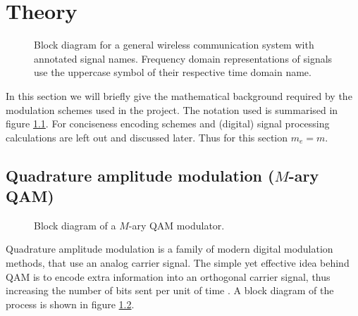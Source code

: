 
\chapter{Theory}

\begin{figure}
	\centering
	\resizebox{\linewidth}{!}{
		
	}
	\caption{
		Block diagram for a general wireless communication system with annotated signal names. Frequency domain representations of signals use the uppercase symbol of their respective time domain name.
		\label{fig:notation}
	}
\end{figure}

In this section we will briefly give the mathematical background required by the modulation schemes used in the project. The notation used is summarised in figure \ref{fig:notation}. For conciseness encoding schemes and (digital) signal processing calculations are left out and discussed later. Thus for this section \(m_e = m\).



\section{Quadrature amplitude modulation (\(M\)-ary QAM)}

\begin{figure}
	\centering
	\resizebox{\linewidth}{!}{
		
	}
	\caption{
		Block diagram of a \(M\)-ary QAM modulator.
		\label{fig:quadrature-modulation}
	}
\end{figure}

Quadrature amplitude modulation is a family of modern digital modulation methods, that use an analog carrier signal. The simple yet effective idea behind QAM is to encode extra information into an orthogonal carrier signal, thus increasing the number of bits sent per unit of time \cite{Gallager,Kneubuehler,Mathis,Hsu}. A block diagram of the process is shown in figure \ref{fig:quadrature-modulation}.


